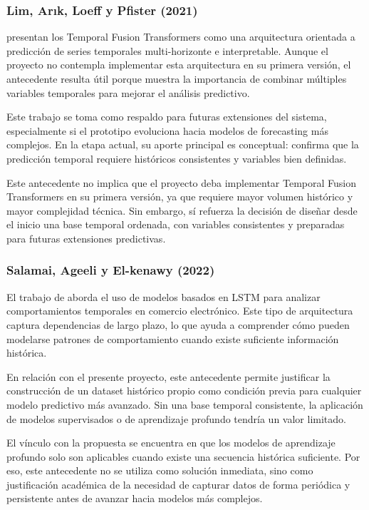 \subsubsection*{Lim, Arık, Loeff y Pfister (2021)}

\textcite{LimArikLoeffPfister2021} presentan los Temporal Fusion Transformers como una arquitectura orientada a predicción de series temporales multi-horizonte e interpretable. Aunque el proyecto no contempla implementar esta arquitectura en su primera versión, el antecedente resulta útil porque muestra la importancia de combinar múltiples variables temporales para mejorar el análisis predictivo.

Este trabajo se toma como respaldo para futuras extensiones del sistema, especialmente si el prototipo evoluciona hacia modelos de forecasting más complejos. En la etapa actual, su aporte principal es conceptual: confirma que la predicción temporal requiere históricos consistentes y variables bien definidas.

Este antecedente no implica que el proyecto deba implementar Temporal Fusion Transformers en su primera versión, ya que requiere mayor volumen histórico y mayor complejidad técnica. Sin embargo, sí refuerza la decisión de diseñar desde el inicio una base temporal ordenada, con variables consistentes y preparadas para futuras extensiones predictivas.

\subsubsection*{Salamai, Ageeli y El-kenawy (2022)}

El trabajo de \textcite{SalamaiAgeeliElkenawy2022} aborda el uso de modelos basados en LSTM para analizar comportamientos temporales en comercio electrónico. Este tipo de arquitectura captura dependencias de largo plazo, lo que ayuda a comprender cómo pueden modelarse patrones de comportamiento cuando existe suficiente información histórica.

En relación con el presente proyecto, este antecedente permite justificar la construcción de un dataset histórico propio como condición previa para cualquier modelo predictivo más avanzado. Sin una base temporal consistente, la aplicación de modelos supervisados o de aprendizaje profundo tendría un valor limitado.

El vínculo con la propuesta se encuentra en que los modelos de aprendizaje profundo solo son aplicables cuando existe una secuencia histórica suficiente. Por eso, este antecedente no se utiliza como solución inmediata, sino como justificación académica de la necesidad de capturar datos de forma periódica y persistente antes de avanzar hacia modelos más complejos.

